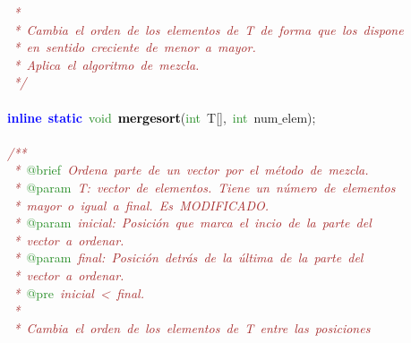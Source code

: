 \mbox{}\textit{\textcolor{Brown}{\ *\ }} \\
\mbox{}\textit{\textcolor{Brown}{\ *\ Cambia\ el\ orden\ de\ los\ elementos\ de\ T\ de\ forma\ que\ los\ dispone}} \\
\mbox{}\textit{\textcolor{Brown}{\ *\ en\ sentido\ creciente\ de\ menor\ a\ mayor.}} \\
\mbox{}\textit{\textcolor{Brown}{\ *\ Aplica\ el\ algoritmo\ de\ mezcla.}} \\
\mbox{}\textit{\textcolor{Brown}{\ */}} \\
\mbox{} \\
\mbox{}\textbf{\textcolor{Blue}{inline}}\ \textbf{\textcolor{Blue}{static}}\ \textcolor{ForestGreen}{void}\ \textbf{\textcolor{Black}{mergesort}}\textcolor{BrickRed}{(}\textcolor{ForestGreen}{int}\ T\textcolor{BrickRed}{[],}\ \textcolor{ForestGreen}{int}\ num$\_$elem\textcolor{BrickRed}{);} \\
\mbox{} \\
\mbox{}\textit{\textcolor{Brown}{/**}} \\
\mbox{}\textit{\textcolor{Brown}{\ *\ }}\textcolor{ForestGreen}{@brief}\textit{\textcolor{Brown}{\ Ordena\ parte\ de\ un\ vector\ por\ el\ método\ de\ mezcla.}} \\
\mbox{}\textit{\textcolor{Brown}{\ *\ }}\textcolor{ForestGreen}{@param}\textit{\textcolor{Brown}{\ T:\ vector\ de\ elementos.\ Tiene\ un\ número\ de\ elementos\ }} \\
\mbox{}\textit{\textcolor{Brown}{\ *\ mayor\ o\ igual\ a\ final.\ Es\ MODIFICADO.}} \\
\mbox{}\textit{\textcolor{Brown}{\ *\ }}\textcolor{ForestGreen}{@param}\textit{\textcolor{Brown}{\ inicial:\ Posición\ que\ marca\ el\ incio\ de\ la\ parte\ del}} \\
\mbox{}\textit{\textcolor{Brown}{\ *\ vector\ a\ ordenar.}} \\
\mbox{}\textit{\textcolor{Brown}{\ *\ }}\textcolor{ForestGreen}{@param}\textit{\textcolor{Brown}{\ final:\ Posición\ detrás\ de\ la\ última\ de\ la\ parte\ del}} \\
\mbox{}\textit{\textcolor{Brown}{\ *\ vector\ a\ ordenar.\ }} \\
\mbox{}\textit{\textcolor{Brown}{\ *\ }}\textcolor{ForestGreen}{@pre}\textit{\textcolor{Brown}{\ inicial\ \textless{}\ final.}} \\
\mbox{}\textit{\textcolor{Brown}{\ *\ }} \\
\mbox{}\textit{\textcolor{Brown}{\ *\ Cambia\ el\ orden\ de\ los\ elementos\ de\ T\ entre\ las\ posiciones}} \\
